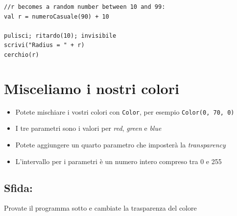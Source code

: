   

\begin{lstlisting}[basicstyle={\ttfamily\fontsize{20}{24}\selectfont},numbers=none]
//r becomes a random number between 10 and 99:
val r = numeroCasuale(90) + 10   

pulisci; ritardo(10); invisibile
scrivi("Radius = " + r)
cerchio(r)
\end{lstlisting}
        
\chapter{Misceliamo i nostri colori}

\begin{itemize}

\item {Potete mischiare i vostri colori con \lstinline{Color}, per esempio \lstinline{Color(0, 70, 0)}}
\item {I tre parametri sono i valori per {\it red}, {\it green} e {\it blue}}
\item {Potete aggiungere un quarto parametro che imposterà la {\it transparency}}
\item {L'intervallo per i parametri è un numero intero compreso tra 0 e 255}

\end{itemize}


\section*{\color{BrickRed}Sfida:}
Provate il programma sotto e cambiate la trasparenza del colore

